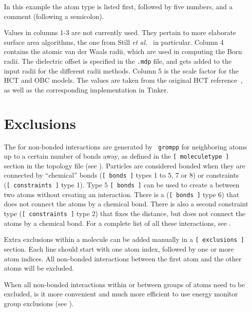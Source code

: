 In this example the atom type is listed first, followed by five
numbers, and a comment (following a semicolon).

Values in columns 1-3 are not currently used. They pertain to more
elaborate surface area algorithms, the one from Still {\em et al.}~\cite{Still97} in
particular.  Column 4 contains the atomic van der Waals radii, which are used
in computing the Born radii. The dielectric offset is specified in
the {\tt *.mdp} file, and gets added to the input radii for the different
radii methods.  Column 5 is the scale factor for the HCT and OBC
models. The values are taken from the original HCT reference~\cite{Truhlar96}, as well
as the corresponding implementation in Tinker.



\section{Exclusions}
\label{sec:excl}
The  for non-bonded interactions are generated by {\tt
grompp} for neighboring atoms up to a certain number of bonds away, as
defined in the {\tt [~moleculetype~]} section in the topology file
(see ). Particles are considered bonded when they are
connected by ``chemical'' bonds ({\tt [~bonds~]} types 1 to 5, 7 or 8)
or constraints ({\tt [~constraints~]} type 1).
Type 5 {\tt [~bonds~]} can be used to create a 
between two atoms without creating an interaction.
There is a 
({\tt [~bonds~]} type 6) that does not connect the atoms by a chemical bond.
There is also a second constraint type ({\tt [~constraints~]} type 2)
that fixes the distance, but does not connect
the atoms by a chemical bond.
For a complete list of all these interactions, see .

Extra exclusions within a molecule can be added manually
in a {\tt [~exclusions~]} section. Each line should start with one
atom index, followed by one or more atom indices. All non-bonded
interactions between the first atom and the other atoms will be excluded.

When all non-bonded interactions within or between groups of atoms need
to be excluded, is it more convenient and much more efficient to use
energy monitor group exclusions (see ).

